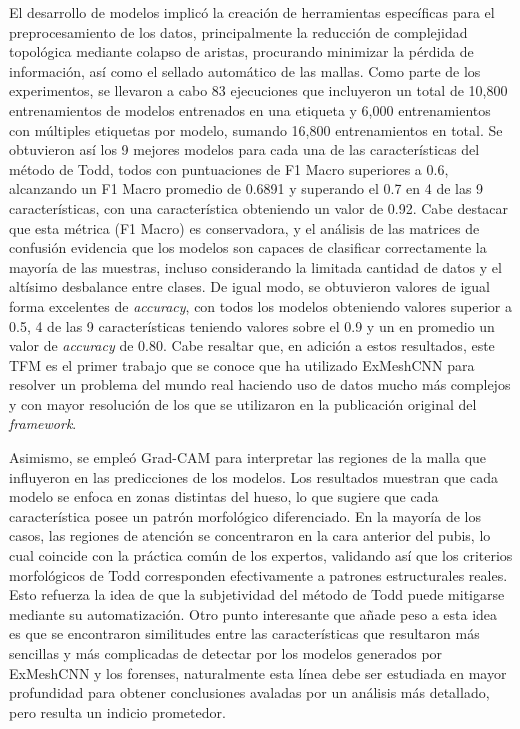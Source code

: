El desarrollo de modelos implicó la creación de herramientas específicas para el preprocesamiento de los datos, principalmente la reducción de complejidad topológica mediante colapso de aristas, procurando minimizar la pérdida de información, así como el sellado automático de las mallas. Como parte de los experimentos, se llevaron a cabo 83 ejecuciones que incluyeron un total de 10,800 entrenamientos de modelos entrenados en una etiqueta y 6,000 entrenamientos con múltiples etiquetas por modelo, sumando 16,800 entrenamientos en total. Se obtuvieron así los 9 mejores modelos para cada una de las características del método de Todd, todos con puntuaciones de F1 Macro superiores a 0.6, alcanzando un F1 Macro promedio de 0.6891 y superando el 0.7 en 4 de las 9 características, con una característica obteniendo un valor de 0.92. Cabe destacar que esta métrica (F1 Macro) es conservadora, y el análisis de las matrices de confusión evidencia que los modelos son capaces de clasificar correctamente la mayoría de las muestras, incluso considerando la limitada cantidad de datos y el altísimo desbalance entre clases. De igual modo, se obtuvieron valores de igual forma excelentes de \textit{accuracy}, con todos los modelos obteniendo valores superior a 0.5, 4 de las 9 características teniendo valores sobre el 0.9 y un en promedio un valor de \textit{accuracy} de 0.80. Cabe resaltar que, en adición a estos resultados, este TFM es el primer trabajo que se conoce que ha utilizado ExMeshCNN para resolver un problema del mundo real haciendo uso de datos mucho más complejos y con mayor resolución de los que se utilizaron en la publicación original del \textit{framework}.

Asimismo, se empleó Grad-CAM para interpretar las regiones de la malla que influyeron en las predicciones de los modelos. Los resultados muestran que cada modelo se enfoca en zonas distintas del hueso, lo que sugiere que cada característica posee un patrón morfológico diferenciado. En la mayoría de los casos, las regiones de atención se concentraron en la cara anterior del pubis, lo cual coincide con la práctica común de los expertos, validando así que los criterios morfológicos de Todd corresponden efectivamente a patrones estructurales reales. Esto refuerza la idea de que la subjetividad del método de Todd puede mitigarse mediante su automatización. Otro punto interesante que añade peso a esta idea es que se encontraron similitudes entre las características que resultaron más sencillas y más complicadas de detectar por los modelos generados por ExMeshCNN y los forenses, naturalmente esta línea debe ser estudiada en mayor profundidad para obtener conclusiones avaladas por un análisis más detallado, pero resulta un indicio prometedor.

